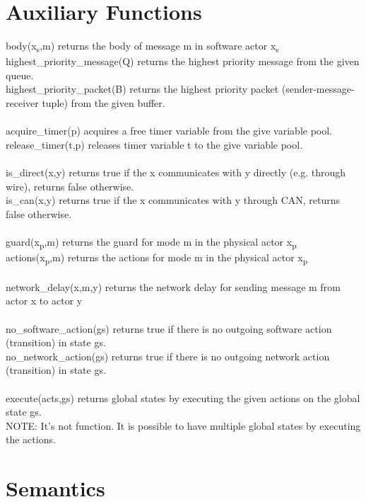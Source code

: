 \documentclass[]{article}
\title{}
\author{}
\begin{document}
\section{Auxiliary Functions}
body(x\textsubscript{s},m) returns the body of message m in software actor x\textsubscript{s} \\
highest\_priority\_message(Q) returns the highest priority message from the given queue. \\
highest\_priority\_packet(B) returns the highest priority packet (sender-message-receiver tuple) from the given buffer. \\ 
\\
acquire\_timer(p) acquires a free timer variable from the give variable pool. \\
release\_timer(t,p) releases timer variable t to the give variable pool. \\
\\
is\_direct(x,y) returns true if the x communicates with y directly (e.g. through wire), returns false otherwise. \\
is\_can(x,y) returns true if the x communicates with y through CAN, returns false otherwise. \\
\\
guard(x\textsubscript{p},m) returns the guard for mode m in the physical actor x\textsubscript{p} \\
actions(x\textsubscript{p},m) returns the actions for mode m in the physical actor x\textsubscript{p} \\
\\
network\_delay(x,m,y) returns the network delay for sending message m from actor x to actor y \\
\\
no\_software\_action(gs) returns true if there is no outgoing software action (transition) in state gs. \\
no\_network\_action(gs) returns true if there is no outgoing network action (transition) in state gs. \\
\\
execute(acts,gs) returns global states by executing the given actions on the global state gs. \\
NOTE: It's not function. It is possible to have multiple global states by executing the actions. \\

\section{Semantics}
\end{document}

